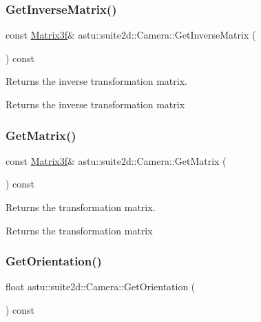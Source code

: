 \subsubsection{\texorpdfstring{Get\+Inverse\+Matrix()}{GetInverseMatrix()}}
{\footnotesize\ttfamily const \hyperlink{classastu_1_1Matrix3}{Matrix3f}\& astu\+::suite2d\+::\+Camera\+::\+Get\+Inverse\+Matrix (\begin{DoxyParamCaption}{ }\end{DoxyParamCaption}) const}

Returns the inverse transformation matrix.

\begin{DoxyReturn}{Returns}
the inverse transformation matrix 
\end{DoxyReturn}
\mbox{\label{classastu_1_1suite2d_1_1Camera_a55247c21a90994449b512080989e2e1c}} 
\subsubsection{\texorpdfstring{Get\+Matrix()}{GetMatrix()}}
{\footnotesize\ttfamily const \hyperlink{classastu_1_1Matrix3}{Matrix3f}\& astu\+::suite2d\+::\+Camera\+::\+Get\+Matrix (\begin{DoxyParamCaption}{ }\end{DoxyParamCaption}) const}

Returns the transformation matrix.

\begin{DoxyReturn}{Returns}
the transformation matrix 
\end{DoxyReturn}
\mbox{\label{classastu_1_1suite2d_1_1Camera_ad48c85024f99c5018ed9e3733ca74301}} 
\subsubsection{\texorpdfstring{Get\+Orientation()}{GetOrientation()}}
{\footnotesize\ttfamily float astu\+::suite2d\+::\+Camera\+::\+Get\+Orientation (\begin{DoxyParamCaption}{ }\end{DoxyParamCaption}) const}


